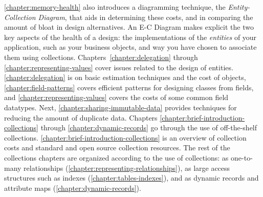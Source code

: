 \autoref{chapter:memory-health} also introduces a diagramming technique, the
\emph{Entity-Collection Diagram}, that aids in determining these costs, and in
comparing the amount of bloat in design alternatives.
An E-C Diagram makes explicit the two key aspects of the health of a design:
the implementations of the \emph{entities} of your application, such as your
business objects, and way you have chosen to associate them using collections.
Chapters~\ref{chapter:delegation} through
\ref{chapter:representing-values} cover issues related to the design of
entities. \autoref{chapter:delegation} is on basic estimation techniques and
the cost of objects, \autoref{chapter:field-patterns} covers efficient patterns
for designing classes from fields, and \autoref{chapter:representing-values}
covers the costs of some common field
datatypes. Next, \autoref{chapter:sharing-immutable-data} provides techniques
for reducing the amount of duplicate data.
Chapters \ref{chapter:brief-introduction-collections} through
\ref{chapter:dynamic-records} go through the use of
off-the-shelf collections. \autoref{chapter:brief-introduction-collections} is
an overview of collection costs and standard and open source
collection resources.
The rest of the collections chapters are organized according to the use of
collections:
as one-to-many relationships (\autoref{chapter:representing-relationships}),
as large access structures such as indexes
(\autoref{chapter:tables-indexes}), and as dynamic records and attribute maps
(\autoref{chapter:dynamic-records}).

\begin{comment}
[NMM 20120628 too much E-C diagram detail for intro?]
A data model implementation begins with a conceptual understanding of the
entities and relationships in the model.  This may be an informal understanding,
or it may be formalized in a diagram such as an E-R diagram or a UML class
diagram.  At some point that conceptual model is turned into Java classes that
represent the entities, attributes, and assocations of the model, as well as any
auxiliary structures, such as indexes, needed to access the data.  The example
below shows a simple conceptual model, using a UML class diagram.  A Java
implementation of that model is also shown, using rectangles for classes and
arrows for references.  %
in that it shows
\end{comment}

